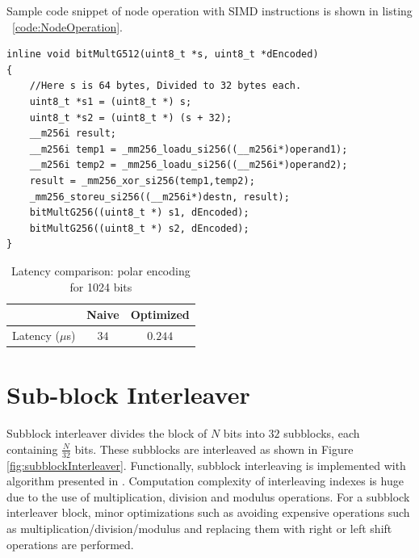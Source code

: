 Sample code snippet of node operation with SIMD instructions is shown in listing ~\ref{code:NodeOperation}.

\begin{code}
	\label{code:NodeOperation}
\begin{verbatim}
inline void bitMultG512(uint8_t *s, uint8_t *dEncoded) 
{
	//Here s is 64 bytes, Divided to 32 bytes each.
	uint8_t *s1 = (uint8_t *) s;
	uint8_t *s2 = (uint8_t *) (s + 32);
	__m256i result;
	__m256i temp1 = _mm256_loadu_si256((__m256i*)operand1);
	__m256i temp2 = _mm256_loadu_si256((__m256i*)operand2);
	result = _mm256_xor_si256(temp1,temp2);
	_mm256_storeu_si256((__m256i*)destn, result);
	bitMultG256((uint8_t *) s1, dEncoded);
	bitMultG256((uint8_t *) s2, dEncoded);
}
\end{verbatim}
\end{code}

\begin{table}[!h]
	\begin{center}
		\caption{Latency comparison: polar encoding for 1024 bits}
		\label{tab:polarEncoder}
		\begin{tabular}{c|c|c} %
			\textbf{ } & Naive & Optimized \\
			\hline
			Latency ($\mu$s) & $34$ & $0.244$\\
		\end{tabular}
	\end{center}
\end{table}


\section{Sub-block Interleaver}
Subblock interleaver divides the block of $N$ bits into $32$ subblocks, each containing $\frac{N}{32}$ bits. These subblocks are interleaved as shown in Figure \ref{fig:subblockInterleaver}. Functionally, subblock interleaving is implemented with algorithm presented in \cite{3gpp.38.212}. Computation complexity of interleaving indexes is huge due to the use of multiplication, division and modulus operations. For a subblock interleaver block, minor optimizations such as avoiding expensive operations such as multiplication/division/modulus and replacing them with right or left shift operations are performed.

